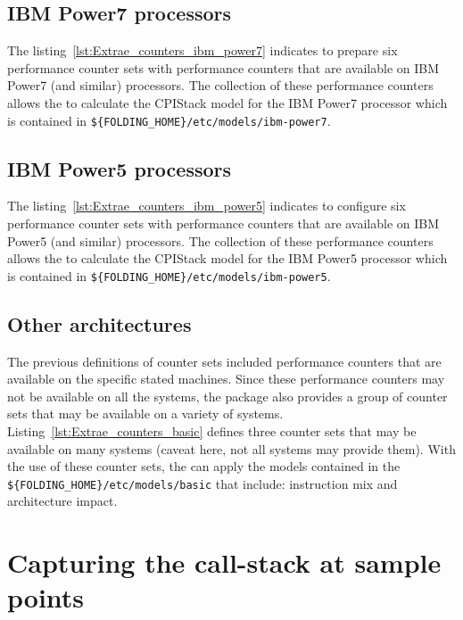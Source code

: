 \subsection{IBM Power7 processors}



The listing~\ref{lst:Extrae_counters_ibm_power7} indicates \EXTRAE to prepare six performance counter sets with performance counters that are available on IBM Power7 (and similar) processors.
The collection of these performance counters allows the \FOLDING to calculate the CPIStack model for the IBM Power7 processor which is contained in \texttt{\$\{FOLDING\_HOME\}/etc/models/ibm-power7}.

\subsection{IBM Power5 processors}



The listing~\ref{lst:Extrae_counters_ibm_power5} indicates \EXTRAE to configure six performance counter sets with performance counters that are available on IBM Power5 (and similar) processors.
The collection of these performance counters allows the \FOLDING to calculate the CPIStack model for the IBM Power5 processor which is contained in \texttt{\$\{FOLDING\_HOME\}/etc/models/ibm-power5}.

\subsection{Other architectures}



The previous definitions of counter sets included performance counters that are available on the specific stated machines.
Since these performance counters may not be available on all the systems, the package also provides a group of counter sets that may be available on a variety of systems.
Listing~\ref{lst:Extrae_counters_basic} defines three \EXTRAE counter sets that may be available on many systems (caveat here, not all systems may provide them).
With the use of these counter sets, the \FOLDING can apply the models contained in the \texttt{\$\{FOLDING\_HOME\}/etc/models/basic} that include: instruction mix and architecture impact.


\section{Capturing the call-stack at sample points}

